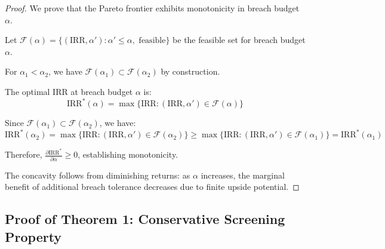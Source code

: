\documentclass[11pt,a4paper]{article}
\begin{document}
\begin{proof}
We prove that the Pareto frontier exhibits monotonicity in breach budget $\alpha$.

Let $\mathcal{F}(\alpha) = \{(\text{IRR}, \alpha') : \alpha' \leq \alpha, \text{ feasible}\}$ be the feasible set for breach budget $\alpha$.

For $\alpha_1 < \alpha_2$, we have $\mathcal{F}(\alpha_1) \subset \mathcal{F}(\alpha_2)$ by construction.

The optimal IRR at breach budget $\alpha$ is:
\begin{equation}
\text{IRR}^*(\alpha) = \max\{\text{IRR} : (\text{IRR}, \alpha') \in \mathcal{F}(\alpha)\}
\end{equation}

Since $\mathcal{F}(\alpha_1) \subset \mathcal{F}(\alpha_2)$, we have:
\begin{equation}
\text{IRR}^*(\alpha_2) = \max\{\text{IRR} : (\text{IRR}, \alpha') \in \mathcal{F}(\alpha_2)\} \geq \max\{\text{IRR} : (\text{IRR}, \alpha') \in \mathcal{F}(\alpha_1)\} = \text{IRR}^*(\alpha_1)
\end{equation}

Therefore, $\frac{\partial \text{IRR}^*}{\partial \alpha} \geq 0$, establishing monotonicity.

The concavity follows from diminishing returns: as $\alpha$ increases, the marginal benefit of additional breach tolerance decreases due to finite upside potential.
\end{proof}

\subsection{Proof of Theorem 1: Conservative Screening Property}
\end{document}
